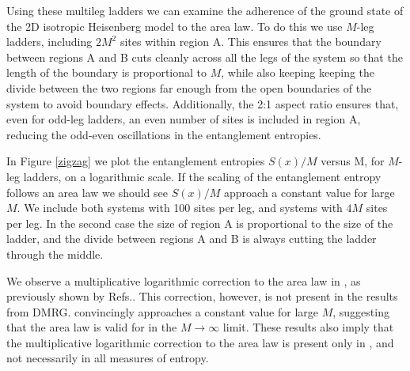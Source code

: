Using these multileg ladders we can examine the adherence of the ground state of the 2D isotropic Heisenberg model to the area law.
To do this we use $M$-leg ladders, including $2M^2$ sites within region A.  
This ensures that the boundary between regions A and B cuts cleanly across all the legs of the system so that the length of the boundary is proportional to $M$, while also keeping keeping the divide between the two regions far enough from the open boundaries of the system to avoid boundary effects.
Additionally, the 2:1 aspect ratio ensures that, even for odd-leg ladders, an even number of sites is included in region A, reducing the odd-even oscillations in the entanglement entropies.

In Figure \ref{zigzag} we plot the entanglement entropies $S(x)/M$ versus M, for $M$-leg ladders,  on a logarithmic scale.
If the scaling of the entanglement entropy follows an area law we should see $S(x)/M$ approach a constant value for large $M$.
We include both systems with 100 sites per leg, and systems with $4M$ sites per leg. 
In the second case the size of region A is proportional to the size of the ladder, and the divide between regions A and B is always cutting the ladder through the middle.

We observe a multiplicative logarithmic correction to the area law in \vB, as previously shown by Refs.\cite{Alet,Chh}.
This correction, however, is not present in the \vn results from DMRG.
\vn convincingly approaches a constant value for large $M$, suggesting that the area law is valid for \vn in the $M \rightarrow \infty$ limit. 
These results also imply that the multiplicative logarithmic correction to the area law is present only in \vB, and not necessarily in all measures of entropy.


 
